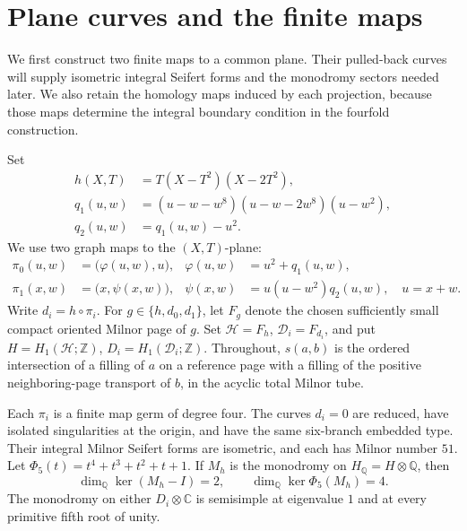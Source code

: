 \section{Plane curves and the finite maps}\label{sec:plane-cover}

We first construct two finite maps to a common plane.  Their pulled-back
curves will supply isometric integral Seifert forms and the monodromy
sectors needed later.  We also retain the homology maps induced by each
projection, because those maps determine the integral boundary condition
in the fourfold construction.

Set
\begin{align*}
 h(X,T)&=T(X-T^2)(X-2T^2),\\
 q_1(u,w)&=(u-w-w^8)(u-w-2w^8)(u-w^2),\\
 q_2(u,w)&=q_1(u,w)-u^2 .
\end{align*}
We use two graph maps to the \((X,T)\)-plane:
\begin{align*}
 \pi_0(u,w)&=\bigl(\varphi(u,w),u\bigr),
    &\varphi(u,w)&=u^2+q_1(u,w),\\
 \pi_1(x,w)&=\bigl(x,\psi(x,w)\bigr),
    &\psi(x,w)&=u(u-w^2)q_2(u,w),\quad u=x+w.
\end{align*}
Write \(d_i=h\circ\pi_i\). For \(g\in\{h,d_0,d_1\}\), let \(F_g\)
denote the chosen sufficiently small compact oriented Milnor page of
\(g\). Set \(\mathcal H=F_h\), \(\mathcal D_i=F_{d_i}\), and put
\(H=H_1(\mathcal H;\mathbb Z)\), \(D_i=H_1(\mathcal D_i;\mathbb Z)\).
Throughout, \(s(a,b)\) is the ordered intersection of a filling of
\(a\) on a reference page with a filling of the positive neighboring-page
transport of \(b\), in the acyclic total Milnor tube.

\begin{lemma}\label{lem:plane-data}
Each \(\pi_i\) is a finite map germ of degree four. The curves \(d_i=0\)
are reduced, have isolated singularities at the origin, and have the same
six-branch embedded type. Their integral Milnor Seifert forms are
isometric, and each has Milnor number \(51\).
Let \(\Phi_5(t)=t^4+t^3+t^2+t+1\).  If \(M_h\) is the monodromy on
\(H_{\mathbb Q}=H\otimes\mathbb Q\), then
\[
 \dim_{\mathbb Q}\ker(M_h-I)=2,\qquad
 \dim_{\mathbb Q}\ker\Phi_5(M_h)=4.
\]
The monodromy on either \(D_i\otimes\mathbb C\) is semisimple at
eigenvalue \(1\) and at every primitive fifth root of unity.
\end{lemma}

